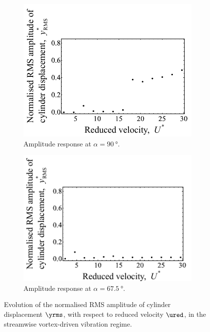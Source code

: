 \documentclass[a4paper,fleqn]{cas-sc}
\begin{document}
\begin{figure}
  \centering
  \begin{subfigure}[h]{0.38\textwidth}
    \includegraphics[width=\textwidth]{figs/yStrRMS1}
    \caption{Amplitude response at $\alpha = \SI{90}{\degree}$.}
    \label{fig:yStrRMS1}
  \end{subfigure}

  \begin{subfigure}[h]{0.38\textwidth}
    \includegraphics[width=\textwidth]{figs/yStrRMS2}
    \caption{Amplitude response at $\alpha = \SI{67.5}{\degree}$.}
    \label{fig:yStrRMS2}
  \end{subfigure}
  \caption{Evolution of the normalised RMS amplitude of cylinder displacement $\yrms$, with respect to reduced velocity $\ured$, in the streamwise vortex-driven vibration regime.} \label{fig:yStrRMSStreamwise}
\end{figure}
\end{document}
